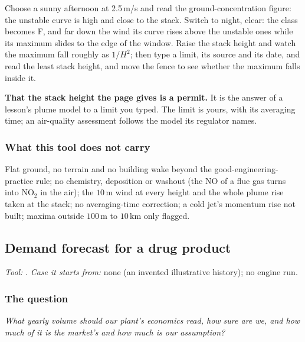 \documentclass[11pt,a4paper]{article}
\begin{document}
\begin{tryit}
Choose a sunny afternoon at 2.5\,m/s and read the ground-concentration figure:
the unstable curve is high and close to the stack.  Switch to night, clear: the
class becomes F, and far down the wind its curve rises above the unstable ones
while its maximum slides to the edge of the window.  Raise the stack height and
watch the maximum fall roughly as $1/H^{2}$; then type a limit, its source and
its date, and read the least stack height, and move the fence to see whether the
maximum falls inside it.
\end{tryit}

\begin{pitfall}
\textbf{That the stack height the page gives is a permit.}  It is the answer of
a lesson's plume model to a limit you typed.  The limit is yours, with its
averaging time; an air-quality assessment follows the model its regulator names.
\end{pitfall}

\subsubsection*{What this tool does not carry}

Flat ground, no terrain and no building wake beyond the good-engineering-practice
rule; no chemistry, deposition or washout (the NO of a flue gas turns into
NO$_2$ in the air); the $10$\,m wind at every height and the whole plume rise
taken at the stack; no averaging-time correction; a cold jet's momentum rise not
built; maxima outside $100$\,m to $10$\,km only flagged.

\subsection{Demand forecast for a drug product}\label{sec:edu-demand-forecast}


\noindent\textit{\small Tool:} .  \textit{\small
Case it starts from:} none (an invented illustrative history); no engine run.

\subsubsection*{The question}

\emph{What yearly volume should our plant's economics read, how sure are we,
and how much of it is the market's and how much is our assumption?}
\end{document}
